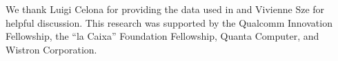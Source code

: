 \documentclass{article}  %
\begin{document}
We thank Luigi Celona for providing the data used in \cite{luigi} and Vivienne Sze for helpful discussion. This research was supported by the Qualcomm Innovation Fellowship, the ``la Caixa'' Foundation Fellowship, Quanta Computer, and Wistron Corporation.



% 
% 
% 

% 



\clearpage
\newpage  %
\appendix






\appendix




\end{document}
